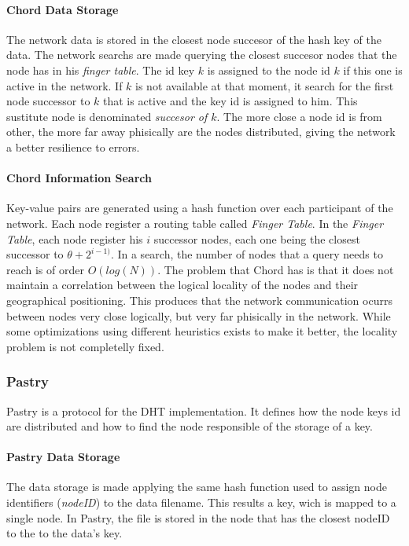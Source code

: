 \paragraph{Chord Data Storage}
The network data is stored in the closest node succesor of the hash key of the
data. The network searchs are made querying the closest succesor
nodes that the node has in his \textit{finger table}.
The id key $k$ is assigned to the node id $k$ if this one is active in the
network. If $k$ is not available at that moment, it search for the first node
successor to $k$ that is active and the key id is assigned to him. This
sustitute node is denominated \textit{succesor of $k$}.
The more close a node id is from other, the more far away phisically are the
nodes distributed, giving the network a better resilience to errors.

\paragraph{Chord Information Search}
Key-value pairs are generated using a hash function over each participant of
the network.  Each node register a routing table called \textit{Finger Table}.
In the \textit{Finger Table}, each node register his $i$ successor nodes, each
one being the closest successor to $\theta + 2^{i-1)}$. 
In a search, the number of nodes that a query needs to reach is of order
$O(log(N))$.
The problem that Chord has is that it does not maintain a correlation
between the logical locality of the nodes and their geographical positioning. This
produces that the network communication ocurrs between nodes very close
logically, but very far phisically in the network. While some
optimizations using different heuristics exists to make it better, the locality
problem is not completelly fixed.

\subsubsection{Pastry}
\label{sec:pastry}
Pastry is a protocol for the DHT implementation. It defines how the node keys id
are distributed and how to find the node responsible of the storage of a key.

\paragraph{Pastry Data Storage}

The data storage is made applying the same hash function used to assign node
identifiers (\textit{nodeID}) to the data filename. This results a key, wich is
mapped to a single node. In Pastry, the file is stored in the node that has the closest nodeID to
the to the data's key.

